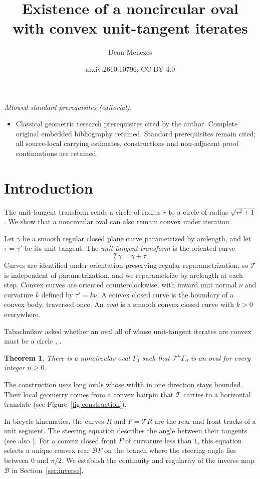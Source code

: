 \documentclass[11pt]{article}
\title{Existence of a noncircular oval with convex unit-tangent iterates}
\author{Dean Menezes}
\date{arxiv:2610.10796; CC BY 4.0}
\numberwithin{equation}{section}
\newtheorem{theorem}{Theorem}[section]
\newcommand{\Tmap}{\mathcal T}
\newcommand{\Bmap}{\mathcal B}
\begin{document}
\maketitle
\noindent\textit{Allowed standard prerequisites (editorial).}\begin{itemize}
\item Classical geometric research prerequisites cited by the author. Complete original embedded bibliography retained. Standard prerequisites remain cited; all source-local carrying estimates, constructions and non-adjacent proof continuations are retained.
\end{itemize}\medskip
\section{Introduction}

The unit-tangent transform sends a circle of radius \(r\) to a circle of
radius \(\sqrt{r^2+1}\). We show that a noncircular oval can also remain
convex under iteration.

Let \(\gamma\) be a smooth regular closed plane curve
parametrized by arclength, and let \(\tau=\gamma'\) be its unit tangent.
The \emph{unit-tangent transform} is the oriented curve
\[
  \Tmap\gamma=\gamma+\tau.
\]
Curves are identified under orientation-preserving regular
reparametrization, so \(\Tmap\) is independent of parametrization, and we
reparametrize by arclength at each step. Convex curves are
oriented counterclockwise, with inward unit normal \(\nu\) and curvature
\(k\) defined by \(\tau'=k\nu\). A convex closed curve is the boundary of a
convex body, traversed once. An \emph{oval} is a smooth convex closed curve
with \(k>0\) everywhere.

Tabachnikov asked whether an oval all of whose unit-tangent iterates are
convex must be a circle \cite[Section~9]{Tabachnikov2015},
\cite[Conjecture~4]{Tabachnikov2023}.


\begin{theorem}\label{thm:main}
There is a noncircular oval \(\Gamma_0\) such that \(\Tmap^n\Gamma_0\) is an
oval for every integer \(n\geq0\).
\end{theorem}


The construction uses long ovals whose width in one direction stays bounded. Their local
geometry comes from a convex hairpin that \(\Tmap\) carries to a
horizontal translate (see Figure~\ref{fig:construction}).

In bicycle kinematics, the curves \(R\) and \(F=\Tmap R\) are the rear and front
tracks of a unit segment. The steering equation describes the angle
between their tangents \cite[Section~2]{LeviTabachnikov} (see also
\cite[Proposition~2.6]{BorLeviPerlineTabachnikov2020}). For a convex closed
front \(F\) of curvature less than \(1\), this equation selects a unique convex
rear \(\Bmap F\) on the branch where the steering angle lies between \(0\) and
\(\pi/2\). We establish the continuity and regularity of the inverse map
\(\Bmap\) in Section~\ref{sec:inverse}.
\end{document}
